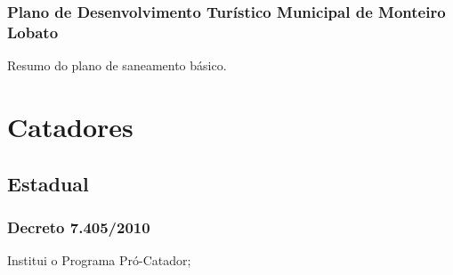 \begin{subapend}
\begin{subsubapend}
		\subsubsection{Plano de Desenvolvimento Turístico Municipal de Monteiro Lobato}
		Resumo do plano de saneamento básico.
	\end{subsubapend}
\end{subapend}

\section{Catadores}


\begin{subapend}
	\subsection{Estadual}
	\begin{subsubapend}
		\subsubsection{Decreto 7.405/2010}
		Institui o Programa Pró-Catador;
	\end{subsubapend}
\end{subapend}

